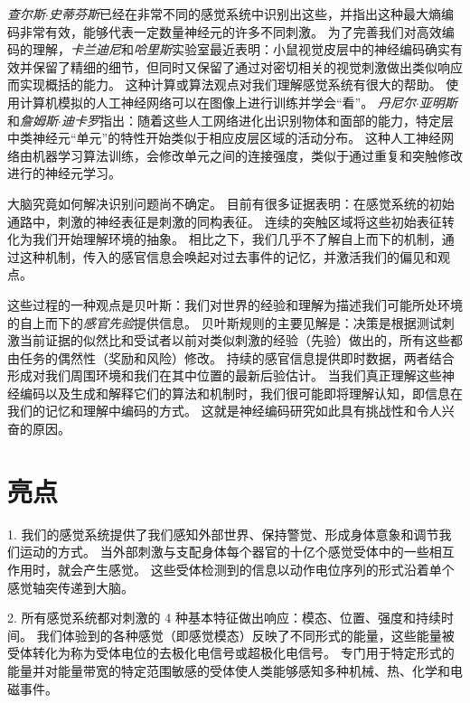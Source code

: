 \textit{查尔斯$\cdot$史蒂芬斯}已经在非常不同的感觉系统中识别出这些，并指出这种最大熵编码非常有效，能够代表一定数量神经元的许多不同刺激\cite{stevens2018conserved,stevens2015fly}。
为了完善我们对高效编码的理解，\textit{卡兰迪尼}和\textit{哈里斯}实验室最近表明：小鼠视觉皮层中的神经编码确实有效并保留了精细的细节，但同时又保留了通过对密切相关的视觉刺激做出类似响应而实现概括的能力\cite{stringer2019high}。
这种计算或算法观点对我们理解感觉系统有很大的帮助。
使用计算机模拟的人工神经网络可以在图像上进行训练并学会“看”。
\textit{丹尼尔$\cdot$亚明斯}和\textit{詹姆斯$\cdot$迪卡罗}指出：随着这些人工网络进化出识别物体和面部的能力，特定层中类神经元“单元”的特性开始类似于相应皮层区域的活动分布\cite{yamins2016using}。
这种人工神经网络由机器学习算法训练，会修改单元之间的连接强度，类似于通过重复和突触修改进行的神经元学习。


大脑究竟如何解决识别问题尚不确定。
目前有很多证据表明：在感觉系统的初始通路中，刺激的神经表征是刺激的同构表征。
连续的突触区域将这些初始表征转化为我们开始理解环境的抽象。
相比之下，我们几乎不了解自上而下的机制，通过这种机制，传入的感官信息会唤起对过去事件的记忆，并激活我们的偏见和观点。


这些过程的一种观点是贝叶斯：我们对世界的经验和理解为描述我们可能所处环境的自上而下的\textit{感官先验}提供信息。
贝叶斯规则的主要见解是：决策是根据测试刺激当前证据的似然比和受试者以前对类似刺激的经验（先验）做出的，所有这些都由任务的偶然性（奖励和风险）修改。
持续的感官信息提供即时数据，两者结合形成对我们周围环境和我们在其中位置的最新后验估计。
当我们真正理解这些神经编码以及生成和解释它们的算法和机制时，我们很可能即将理解认知，即信息在我们的记忆和理解中编码的方式。
这就是神经编码研究如此具有挑战性和令人兴奋的原因。



\section{亮点}

1. 我们的感觉系统提供了我们感知外部世界、保持警觉、形成身体意象和调节我们运动的方式。
当外部刺激与支配身体每个器官的十亿个感觉受体中的一些相互作用时，就会产生感觉。
这些受体检测到的信息以动作电位序列的形式沿着单个感觉轴突传递到大脑。

2. 所有感觉系统都对刺激的 4 种基本特征做出响应：模态、位置、强度和持续时间。
我们体验到的各种感觉（即感觉模态）反映了不同形式的能量，这些能量被受体转化为称为受体电位的去极化电信号或超极化电信号。
专门用于特定形式的能量并对能量带宽的特定范围敏感的受体使人类能够感知多种机械、热、化学和电磁事件。


